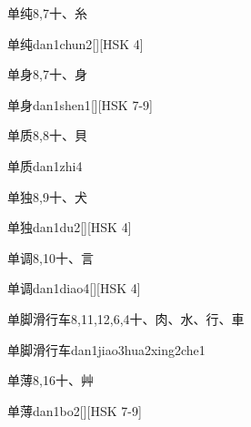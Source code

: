 \begin{Entry}{单纯}{8,7}{⼗、⽷}
  \begin{Phonetics}{单纯}{dan1chun2}[][HSK 4]
  \end{Phonetics}
\end{Entry}

\begin{Entry}{单身}{8,7}{⼗、⾝}
  \begin{Phonetics}{单身}{dan1shen1}[][HSK 7-9]
  \end{Phonetics}
\end{Entry}

\begin{Entry}{单质}{8,8}{⼗、⾙}
  \begin{Phonetics}{单质}{dan1zhi4}
  \end{Phonetics}
\end{Entry}

\begin{Entry}{单独}{8,9}{⼗、⽝}
  \begin{Phonetics}{单独}{dan1du2}[][HSK 4]
  \end{Phonetics}
\end{Entry}

\begin{Entry}{单调}{8,10}{⼗、⾔}
  \begin{Phonetics}{单调}{dan1diao4}[][HSK 4]
  \end{Phonetics}
\end{Entry}

\begin{Entry}{单脚滑行车}{8,11,12,6,4}{⼗、⾁、⽔、⾏、⾞}
  \begin{Phonetics}{单脚滑行车}{dan1jiao3hua2xing2che1}
  \end{Phonetics}
\end{Entry}

\begin{Entry}{单薄}{8,16}{⼗、⾋}
  \begin{Phonetics}{单薄}{dan1bo2}[][HSK 7-9]
  \end{Phonetics}
\end{Entry}

